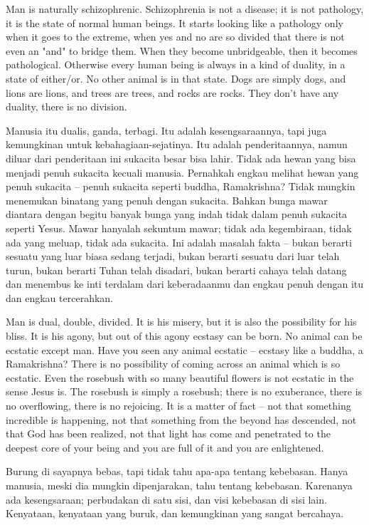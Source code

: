 \english
Man is naturally schizophrenic. Schizophrenia is not a disease; it is not pathology, it is the state of normal human beings. It starts looking like a pathology only when it goes to the extreme, when yes and no are so divided that there is not even an "and" to bridge them. When they become unbridgeable, then it becomes pathological. Otherwise every human being is always in a kind of duality, in a state of either/or. No other animal is in that state. Dogs are simply dogs, and lions are lions, and trees are trees, and rocks are rocks. They don't have any duality, there is no division.

\bahasa
Manusia itu dualis, ganda, terbagi. Itu adalah kesengsaraannya, tapi juga kemungkinan untuk kebahagiaan-sejatinya. Itu adalah penderitaannya, namun diluar dari penderitaan ini sukacita besar bisa lahir. Tidak ada hewan yang bisa menjadi penuh sukacita kecuali manusia. Pernahkah engkau melihat hewan yang penuh sukacita -- penuh sukacita seperti buddha, Ramakrishna? Tidak mungkin menemukan binatang yang penuh dengan sukacita. Bahkan bunga mawar diantara dengan begitu banyak bunga yang indah tidak dalam penuh sukacita seperti Yesus. Mawar hanyalah sekuntum mawar; tidak ada kegembiraan, tidak ada yang meluap, tidak ada sukacita. Ini adalah masalah fakta -- bukan berarti sesuatu yang luar biasa sedang terjadi, bukan berarti sesuatu dari luar telah turun, bukan berarti Tuhan telah disadari, bukan berarti cahaya telah datang dan menembus ke inti terdalam dari keberadaanmu dan engkau penuh dengan itu dan engkau tercerahkan.

\english
Man is dual, double, divided. It is his misery, but it is also the possibility for his bliss. It is his agony, but out of this agony ecstasy can be born. No animal can be ecstatic except man. Have you seen any animal ecstatic -- ecstasy like a buddha, a Ramakrishna? There is no possibility of coming across an animal which is so ecstatic. Even the rosebush with so many beautiful flowers is not ecstatic in the sense Jesus is. The rosebush is simply a rosebush; there is no exuberance, there is no overflowing, there is no rejoicing. It is a matter of fact -- not that something incredible is happening, not that something from the beyond has descended, not that God has been realized, not that light has come and penetrated to the deepest core of your being and you are full of it and you are enlightened.

\bahasa
Burung di sayapnya bebas, tapi tidak tahu apa-apa tentang kebebasan. Hanya manusia, meski dia mungkin dipenjarakan, tahu tentang kebebasan. Karenanya ada kesengsaraan; perbudakan di satu sisi, dan visi kebebasan di sisi lain. Kenyataan, kenyataan yang buruk, dan kemungkinan yang sangat bercahaya.

